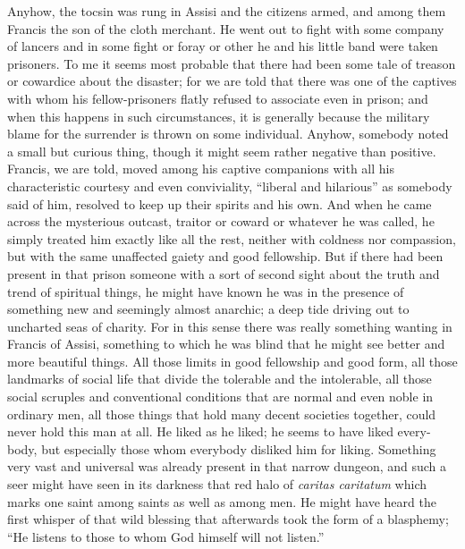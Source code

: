 \documentclass{book}
\begin{document}
Anyhow, the tocsin was rung in Assisi and the citizens armed, and among them Francis the son of the cloth merchant. He went out to fight with some company of lancers and in some fight or foray or other he and his little band were taken prisoners. To me it seems most probable that there had been some tale of treason or cowardice about the disaster; for we are told that there was one of the captives with whom his fellow-prisoners flatly refused to associate even in prison; and when this happens in such circumstances, it is generally because the military blame for the surrender is thrown on some individual. Anyhow, somebody noted a small but curious thing, though it might seem rather negative than positive. Francis, we are told, moved among his captive companions with all his characteristic courtesy and even conviviality, “liberal and hilarious” as somebody said of him, resolved to keep up their spirits and his own. And when he came across the mysterious outcast, traitor or coward or whatever he was called, he simply treated him exactly like all the rest, neither with coldness nor compassion, but with the same unaffected gaiety and good fellowship. But if there had been present in that prison someone with a sort of second sight about the truth and trend of spiritual things, he might have known he was in the presence of something new and seemingly almost anarchic; a deep tide driving out to uncharted seas of charity. For in this sense there was really something wanting in Francis of Assisi, something to which he was blind that he might see better and more beautiful things. All those limits in good fellowship and good form, all those landmarks of social life that divide the tolerable and the intolerable, all those social scruples and conventional conditions that are normal and even noble in ordinary men, all those things that hold many decent societies together, could never hold this man at all. He liked as he liked; he seems to have liked every-body, but especially those whom everybody disliked him for liking. Something very vast and universal was already present in that narrow dungeon, and such a seer might have seen in its darkness that red halo of \emph{caritas caritatum} which marks one saint among saints as well as among men. He might have heard the first whisper of that wild blessing that afterwards took the form of a blasphemy; “He listens to those to whom God himself will not listen.”
\end{document}
